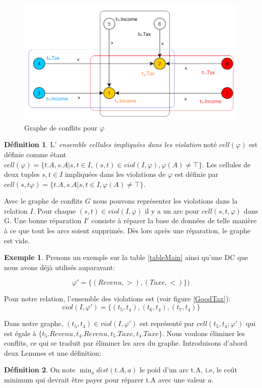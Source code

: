 \documentclass[letterpaper, 12pt]{report}
\theoremstyle{definition}
\newtheorem{mydef}{Définition}
\newtheorem{myexample}{Exemple}
\begin{document}
\begin{figure}
 \centering
 \includegraphics[scale=0.8]{img/grapht4.png}
 \caption{\label{grapht4} Graphe de conflits pour $\varphi$}
\end{figure}

\begin{mydef}
	L' \emph{ensemble cellules impliquées dans les violation} noté $cell(\varphi)$ est définie comme étant $cell(\varphi) = \{t.A,s.A|s,t \in I, (s,t) \in viol(I,\varphi), \varphi(A) \neq \top \}$. Les cellules de deux tuples $s,t \in I$ impliquées dans les violations de $\varphi$ est définie par $cell(s,t\varphi) = \{t.A,s.A|s,t \in I, \varphi(A) \neq \top \}$.
\end{mydef}

Avec le graphe de conflits $G$ nous pouvons représenter les violations dans la relation $I$. Pour chaque $(s,t) \in viol(I,\varphi)$ il y a un arc pour $cell(s,t,\varphi)$ dans G. Une bonne réparation $I'$ consiste à réparer la base de données de telle manière à ce que tout les arcs soient supprimés. Dès lors après une réparation, le graphe est vide.

\begin{myexample}
Prenons un exemple sur la table \ref{tableMain} ainsi qu'une DC que nous avons déjà utilisés auparavant:

$$\varphi' =\{(Revenu,>),(Taxe,<) \})$$

Pour notre relation, l'ensemble des violations est (voir figure \ref{GoodTax}):
 $$ viol(I,\varphi') = \{ (t_5,t_4),(t_6,t_4),(t_7,t_4) \}$$

Dans notre graphe, $(t_5,t_4) \in viol(I,\varphi')$ est représenté par $cell(t_5,t_4;\varphi')$ qui est égale à $\{ t_5.Revenu, t_4.Revenu, t_5.Taxe, t_4.Taxe\}$. Nous voulons éliminer les conflits, ce qui se traduit par éliminer les arcs du graphe. Introduisons d'abord deux Lemmes et une définition: \cite{main}
\end{myexample}
\begin{mydef}
	On note $ \min_{a} dist(t.A,a) $ le poid d'un arc t.A, i.e, le coût minimum qui devrait être payer pour réparer t.A avec une valeur $a$.
\end{mydef}
\end{document}
